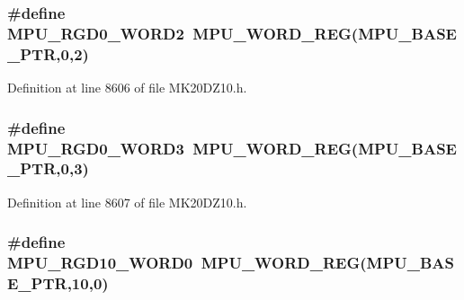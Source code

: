 \subsubsection[{\texorpdfstring{M\+P\+U\+\_\+\+R\+G\+D0\+\_\+\+W\+O\+R\+D2}{MPU_RGD0_WORD2}}]{\setlength{\rightskip}{0pt plus 5cm}\#define M\+P\+U\+\_\+\+R\+G\+D0\+\_\+\+W\+O\+R\+D2~{\bf M\+P\+U\+\_\+\+W\+O\+R\+D\+\_\+\+R\+EG}({\bf M\+P\+U\+\_\+\+B\+A\+S\+E\+\_\+\+P\+TR},0,2)}\hypertarget{group___m_p_u___register___accessor___macros_gaad62e3247717439d9ecc100f15791acb}{}\label{group___m_p_u___register___accessor___macros_gaad62e3247717439d9ecc100f15791acb}


Definition at line 8606 of file M\+K20\+D\+Z10.\+h.

\subsubsection[{\texorpdfstring{M\+P\+U\+\_\+\+R\+G\+D0\+\_\+\+W\+O\+R\+D3}{MPU_RGD0_WORD3}}]{\setlength{\rightskip}{0pt plus 5cm}\#define M\+P\+U\+\_\+\+R\+G\+D0\+\_\+\+W\+O\+R\+D3~{\bf M\+P\+U\+\_\+\+W\+O\+R\+D\+\_\+\+R\+EG}({\bf M\+P\+U\+\_\+\+B\+A\+S\+E\+\_\+\+P\+TR},0,3)}\hypertarget{group___m_p_u___register___accessor___macros_gac6e06b12f22cc8b792dd81c64e89b9da}{}\label{group___m_p_u___register___accessor___macros_gac6e06b12f22cc8b792dd81c64e89b9da}


Definition at line 8607 of file M\+K20\+D\+Z10.\+h.

\subsubsection[{\texorpdfstring{M\+P\+U\+\_\+\+R\+G\+D10\+\_\+\+W\+O\+R\+D0}{MPU_RGD10_WORD0}}]{\setlength{\rightskip}{0pt plus 5cm}\#define M\+P\+U\+\_\+\+R\+G\+D10\+\_\+\+W\+O\+R\+D0~{\bf M\+P\+U\+\_\+\+W\+O\+R\+D\+\_\+\+R\+EG}({\bf M\+P\+U\+\_\+\+B\+A\+S\+E\+\_\+\+P\+TR},10,0)}\hypertarget{group___m_p_u___register___accessor___macros_ga57da8ab5ca2e0258c510d1dd6486fbe4}{}\label{group___m_p_u___register___accessor___macros_ga57da8ab5ca2e0258c510d1dd6486fbe4}


